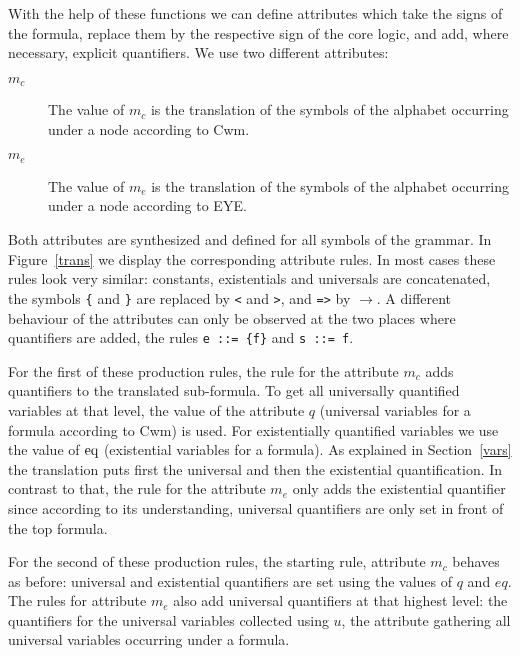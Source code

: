 With the help of these functions we can define attributes which take the signs of the \nthree formula, 
replace them by the respective sign of the core logic,
and add, where necessary, explicit quantifiers.  We use two different attributes:
\begin{description}
 \item[$m_c$] The value of $m_c$ is the translation of the symbols of the alphabet occurring under a node according to Cwm. 
  \item[$m_e$] The value of $m_e$ is the translation of the symbols of the alphabet occurring under a node according to EYE.
\end{description}
Both attributes are synthesized and defined for all symbols of the grammar. In Figure~\ref{trans} we display the corresponding attribute rules. In most cases these 
rules look very similar: constants, existentials and universals are concatenated, the symbols \texttt{\{} and \texttt{\}} are replaced by \texttt{<} and \texttt{>}, and \texttt{=>}
by $\rightarrow$. 
A different behaviour of the attributes can only be observed at the two places where quantifiers are added, the rules \texttt{e~::=~\{f\}} and \texttt{s~::=~f}.

For the first of these production rules, the rule for the attribute $m_c$ adds quantifiers to the translated sub-formula. 
To get all universally quantified variables at that level, the value of the attribute $q$ (universal variables for a formula according to 
Cwm) is used. 
For existentially quantified variables  we use the value of $\text{eq}$ (existential variables for a formula).
As explained in Section~\ref{vars} the translation puts first the universal and then the existential quantification.
In contrast to that, the rule for the attribute $m_e$ only adds the existential quantifier since according to its understanding, 
universal quantifiers are only set in front of the top formula. 

For the second of these production rules, the starting rule, attribute $m_c$ behaves as before: universal and existential quantifiers are set using the values of $q$ and $eq$. 
The rules for attribute $m_e$ also add universal quantifiers at that highest level: the quantifiers for the universal variables collected using $u$, the attribute gathering 
all universal variables occurring under a formula. 

